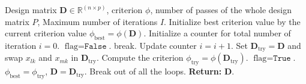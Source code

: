 \documentclass{standalone}
\newcommand{\Real}{\mathbb R}
\begin{document}
\nopagecolor
 \begin{algorithmic}[1]
   \Require Design matrix $\bm{D} \in \Real^{(n\times p)}$, criterion $\phi$, number of passes of the whole design matrix $P$, Maximum number of iterations $I$.
        \State Initialize best criterion value by the current criterion value $\phi_{\text{best}}=\phi(\bm{D})$.
        \State Initialize a counter for total number of iteration $i=0$.
            \State $\text{flag} = \texttt{False}$.
                         break.\EndIf
                        \State Update counter $i = i+1$.
                        \State Set $\bm{D}_{\text{try}} = \bm{D}$ and swap $x_{lk}$ and $x_{mk}$ in $\bm{D}_{\text{try}}$.
                        \State Compute the criterion $\phi_{\text{try}} = \phi(\bm{D}_{\text{try}})$.
                        \State $\text{flag} = \texttt{True}$.
                        \State $\phi_{\text{best}} = \phi_{\text{try}}$, $\bm{D}=\bm{D}_{\text{try}}$.
                    \EndIf
                    \EndFor
                \EndFor
            \EndFor
            \State Break out of all the loops.
            \EndIf
        \EndFor
   \State \textbf{Return:} $\bm{D}$.
\end{algorithmic}
\end{document}
